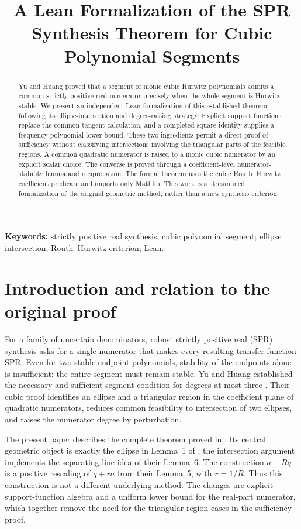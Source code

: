 \documentclass[11pt]{article}
\title{A Lean Formalization of the SPR Synthesis Theorem for Cubic Polynomial Segments}
\begin{document}
\maketitle
\begin{abstract}
Yu and Huang proved that a segment of monic cubic Hurwitz polynomials admits a common strictly positive real numerator precisely when the whole segment is Hurwitz stable. We present an independent Lean formalization of this established theorem, following its ellipse-intersection and degree-raising strategy. Explicit support functions replace the common-tangent calculation, and a completed-square identity supplies a frequency-polynomial lower bound. These two ingredients permit a direct proof of sufficiency without classifying intersections involving the triangular parts of the feasible regions. A common quadratic numerator is raised to a monic cubic numerator by an explicit scalar choice. The converse is proved through a coefficient-level numerator-stability lemma and reciprocation. The formal theorem uses the cubic Routh--Hurwitz coefficient predicate and imports only Mathlib. This work is a streamlined formalization of the original geometric method, rather than a new synthesis criterion.
\end{abstract}
\noindent\textbf{Keywords:} strictly positive real synthesis; cubic polynomial segment; ellipse intersection; Routh--Hurwitz criterion; Lean.

\section{Introduction and relation to the original proof}
For a family of uncertain denominators, robust strictly positive real (SPR) synthesis asks for a single numerator that makes every resulting transfer function SPR. Even for two stable endpoint polynomials, stability of the endpoints alone is insufficient: the entire segment must remain stable. Yu and Huang established the necessary and sufficient segment condition for degrees at most three \cite{yuHuang1999}. Their cubic proof identifies an ellipse and a triangular region in the coefficient plane of quadratic numerators, reduces common feasibility to intersection of two ellipses, and raises the numerator degree by perturbation.

The present paper describes the complete theorem proved in . Its central geometric object is exactly the ellipse in Lemma~1 of \cite{yuHuang1999}; the intersection argument implements the separating-line idea of their Lemma~6. The construction $a+Rq$ is a positive rescaling of $q+ra$ from their Lemma~5, with $r=1/R$. Thus this construction is not a different underlying method. The changes are explicit support-function algebra and a uniform lower bound for the real-part numerator, which together remove the need for the triangular-region cases in the sufficiency proof.
\end{document}
